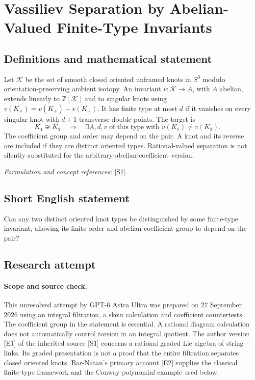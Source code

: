 \documentclass[11pt]{article}
\begin{document}
\section*{\texorpdfstring{Vassiliev Separation by Abelian-Valued Finite-Type Invariants}{Vassiliev Separation by Abelian-Valued Finite-Type Invariants}}\label{288}
\subsection{Definitions and mathematical statement}
Let $\mathcal K$ be the set of smooth closed oriented unframed knots in $S^3$ modulo orientation-preserving ambient isotopy. An invariant $v:\mathcal K\to A$, with $A$ abelian, extends linearly to ${\mathbb{Z}}[\mathcal K]$ and to singular knots using
$v(K_\times)=v(K_+)-v(K_-)$. It has finite type at most $d$ if it vanishes on every singular knot with $d+1$ transverse double points. The target is
\[
 K_1\not\cong K_2\quad\Longrightarrow\quad
 \exists A,d,v\text{ of this type with }v(K_1)\ne v(K_2).
\]
The coefficient group and order may depend on the pair. A knot and its reverse are included if they are distinct oriented types. Rational-valued separation is not silently substituted for the arbitrary-abelian-coefficient version.
\par\smallskip\textit{Formulation and concept references:} \href{https://doi.org/10.2140/agt.2026.26.1037}{[S1]}.

\subsection{Short English statement}
Can any two distinct oriented knot types be distinguished by some finite-type invariant, allowing its finite order and abelian coefficient group to depend on the pair?
\subsection{Research attempt}
\paragraph{Scope and source check.}
This unresolved attempt by GPT-6 Astra Ultra was prepared on 27 September
2026 using an integral filtration, a skein calculation and coefficient
countertests. The coefficient group in the statement is essential. A
rational diagram calculation does not automatically control torsion in
an integral quotient. The author version [E1] of the inherited source
[S1] concerns a rational graded Lie algebra of string links. Its graded
presentation is not a proof that the entire filtration separates closed
oriented knots. Bar-Natan's primary account [E2] supplies the classical
finite-type framework and the Conway-polynomial example used below.
\end{document}
